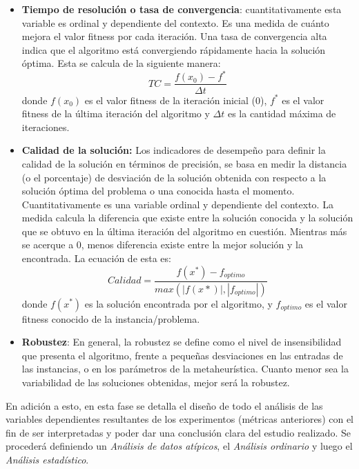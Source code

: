 \begin{enumerate}
\begin{itemize}
        \item \textbf{Tiempo de resolución o tasa de convergencia}: cuantitativamente esta variable es ordinal y dependiente del contexto. Es una medida de cuánto mejora el valor fitness por cada iteración. Una tasa de convergencia alta indica que el algoritmo está convergiendo rápidamente hacia la solución óptima. Esta se calcula de la siguiente manera:
        \begin{equation}
            TC = \frac{f(x_0) - f^*}{\Delta t}
        \end{equation}
        donde $f(x_0)$ es el valor fitness de la iteración inicial (0), $f^*$ es el valor fitness de la última iteración del algoritmo y $\Delta t$ es la cantidad máxima de iteraciones.


        \item \textbf{Calidad de la solución:} Los indicadores de desempeño para definir la calidad de la solución en términos de precisión, se basa en medir la distancia (o el porcentaje) de desviación de la solución obtenida con respecto a la solución óptima del problema o una conocida hasta el momento. Cuantitativamente es una variable ordinal y dependiente del contexto. La medida calcula la diferencia que existe entre la solución conocida y la solución que se obtuvo en la última iteración del algoritmo en cuestión. Mientras más se acerque a 0, menos diferencia existe entre la mejor solución y la encontrada. La ecuación de esta es:
        \begin{equation}
            Calidad = \frac{f(x^*) - f_{optimo}}{max(|f(x*)|,|f_{optimo}|)}
        \end{equation}
        donde $f(x^*)$ es la solución encontrada por el algoritmo, y $f_{optimo}$ es el valor fitness conocido de la instancia/problema.


        \item \textbf{Robustez}: En general, la robustez se define como el nivel de insensibilidad que presenta el algoritmo, frente a pequeñas desviaciones en las entradas de las instancias, o en los parámetros de la metaheurística. Cuanto menor sea la variabilidad de las soluciones obtenidas, mejor será la robustez.

    \end{itemize}


    En adición a esto, en esta fase se detalla el diseño de todo el análisis de las variables dependientes resultantes de los experimentos (métricas anteriores) con el fin de ser interpretadas y poder dar una conclusión clara del estudio realizado. Se procederá definiendo un \textit{Análisis de datos atípicos}, el \textit{Análisis ordinario} y luego el \textit{Análisis estadístico}.



\end{enumerate}
